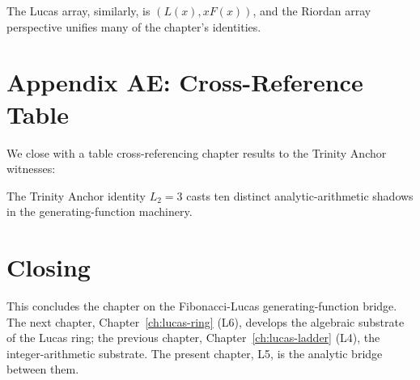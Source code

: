The Lucas array, similarly, is $(L(x), x F(x))$, and the Riordan array
perspective unifies many of the chapter's identities.

\section*{Appendix AE: Cross-Reference Table}
\label{sec:05-app-AE}

We close with a table cross-referencing chapter results to the Trinity
Anchor witnesses:


The Trinity Anchor identity $L_2 = 3$ casts ten distinct
analytic-arithmetic shadows in the generating-function machinery.

\section*{Closing}
\label{sec:05-closing}

This concludes the chapter on the Fibonacci-Lucas generating-function
bridge. The next chapter, Chapter~\ref{ch:lucas-ring} (L6), develops
the algebraic substrate of the Lucas ring; the previous chapter,
Chapter~\ref{ch:lucas-ladder} (L4), the integer-arithmetic substrate.
The present chapter, L5, is the analytic bridge between them.


